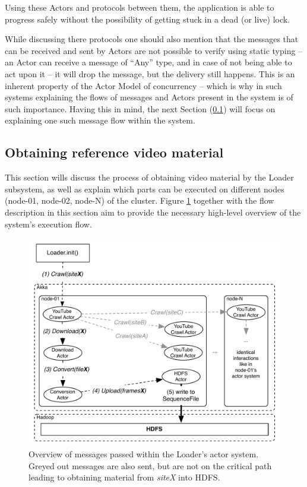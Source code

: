 Using these Actors and protocols between them, the application is able to progress safely without the possibility of getting stuck in a dead (or live) lock. 

While discussing there protocols one should also mention that the messages that can be received and sent by Actors are not possible to verify using static typing -- an Actor can receive a message of ``Any'' type, and in case of not being able to act upon it -- it will drop the message, but the delivery still happens.
This is an inherent property of the Actor Model of concurrency -- which is why in such systems explaining the flows of messages and Actors present in the system is of such importance. Having this in mind, the next Section (\ref{sec:obtaining-reference-material}) will focus on explaining one such message flow within the system.

\subsection{Obtaining reference video material}
\label{sec:obtaining-reference-material}
This section wills discuss the process of obtaining video material by the Loader subsystem, as well as explain which parts can be executed on different nodes (node-01, node-02, node-N) of the cluster. Figure \ref{fig:high-level-loader} together with the flow description in this section aim to provide the necessary high-level overview of the system's execution flow.

\begin{figure}[ch!]
  \centering
  \includegraphics[scale=0.9]{img/loader-high-level.pdf}
  \caption{Overview of messages passed within the Loader's actor system. Greyed out messages are also sent, but are not on the critical path leading to obtaining material from \textit{siteX} into HDFS.}
  \label{fig:high-level-loader}
\end{figure}

